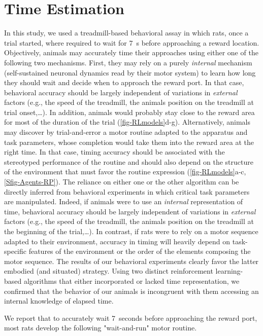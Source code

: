 \section{Time Estimation}
\label{ch:disscusion:time}

In this study, we used a treadmill-based behavioral assay in which rats, once a trial started,  where required to wait for 7~s  before approaching a reward location.
Objectively, animals may accurately time their approaches using either one of the following two mechanisms.
First, they may rely on a purely \textit{internal} mechanism (self-sustained neuronal dynamics read by their motor system) to learn how long they should wait and decide when to approach the reward port.
In that case, behavioral accuracy should be largely independent of variations in \textit{external} factors (e.g., the speed of the treadmill, the animals position on the treadmill at trial onset,\dots).
In addition, animals would probably stay close to the reward area for most of the duration of the trial (\autoref{fig-RLmodels}d-g).
Alternatively, animals may discover by trial-and-error a motor routine adapted to the apparatus and task parameters, whose completion would take them into the reward area at the right time.
In that case, timing accuracy should be associated with the stereotyped performance of the routine and should also depend on the structure of the environment that must favor the routine expression (\autoref{fig-RLmodels}a-c, \autoref{Sfig-Agents-RP}).
The reliance on either one or the other algorithm can be directly inferred from behavioral experiments in which critical task parameters are manipulated.
Indeed, if animals were to use an \textit{internal} representation of time, behavioral accuracy should be largely independent of variations in \textit{external} factors (e.g., the speed of the treadmill, the animals position on the treadmill at the beginning of the trial,\ldots). 
In contrast, if rats were to rely on a motor sequence adapted to their environment, accuracy in timing will heavily depend on task-specific features of the environment or the order of the elements composing the motor sequence.
The results of our behavioral experiments clearly favor the latter embodied (and situated) strategy.
Using two distinct reinforcement learning-based algorithms that either incorporated or lacked time representation, we confirmed that the behavior of our animals is incongruent with them accessing an internal knowledge of elapsed time.
\par
We report that to accurately wait 7~seconds before approaching the reward port, most rats develop the following "wait-and-run" motor routine.

